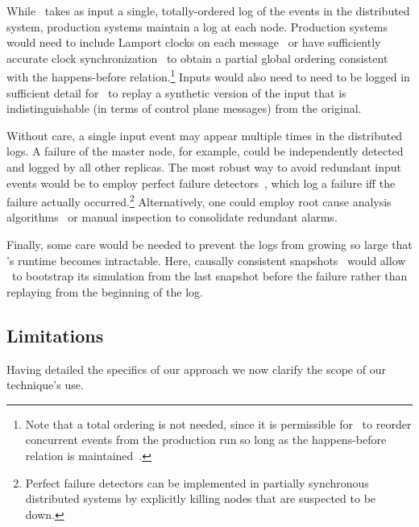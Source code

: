 While \simulator~takes as input a single, totally-ordered log of the events in the
distributed system, production systems maintain a log at each node.
Production systems would need to include Lamport
clocks on each message~\cite{Lamport:1978:TCO:359545.359563} or have
sufficiently accurate clock
synchronization~\cite{corbett2012spanner} to obtain a partial global ordering
consistent with the happens-before relation.\footnote{
Note that a total ordering is not needed, since it is permissible
for \simulator~to reorder concurrent events from
the production run so long as the happens-before relation is
maintained~\cite{Fischer:1985:IDC:3149.214121}.}
Inputs would also need to need to be logged in sufficient detail for \projectname~to
replay a synthetic version of the input that is indistinguishable (in terms
of control plane messages) from the original.

Without care, a single input event may appear multiple times in the
distributed logs. A failure of the master node, for example, could be independently
detected and logged by all other replicas. The most robust way to
avoid redundant input events would be to employ perfect failure
detectors~\cite{chandra1996unreliable}, which log a failure iff
the failure actually occurred.\footnote{Perfect failure detectors can be
implemented in partially synchronous distributed systems by explicitly killing
nodes that are suspected to be down.} %
Alternatively, one
could employ root cause analysis
algorithms~\cite{yemini1996} or manual inspection to consolidate redundant
alarms.

Finally, some care would be needed to prevent the logs from growing so large that
\simulator's runtime becomes intractable. Here, causally consistent
snapshots~\cite{Chandy:1985:DSD:214451.214456} would allow \projectname~to
bootstrap its simulation from the last snapshot before the failure rather than
replaying from the beginning of the log.

\subsection{Limitations}
\label{subsec:non_goals}

Having detailed the specifics of our approach we now
clarify the scope of our technique's use.


